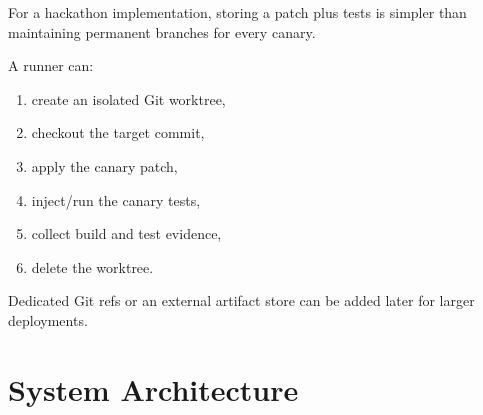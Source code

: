 \documentclass[12pt]{article}
\begin{document}
For a hackathon implementation, storing a patch plus tests is simpler than maintaining permanent branches for every canary.

A runner can:

\begin{enumerate}
    \item create an isolated Git worktree,
    \item checkout the target commit,
    \item apply the canary patch,
    \item inject/run the canary tests,
    \item collect build and test evidence,
    \item delete the worktree.
\end{enumerate}

Dedicated Git refs or an external artifact store can be added later for larger deployments.

\section{System Architecture}
\end{document}
